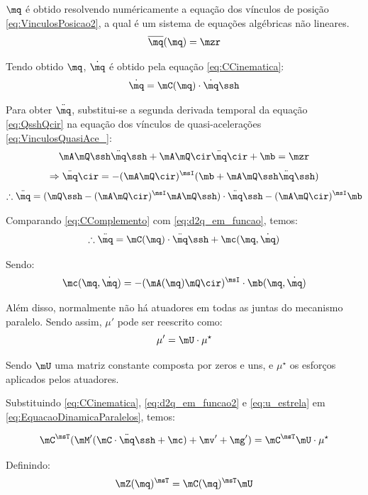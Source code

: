 \documentclass[]{politex}
\begin{document}
$\mq$ é obtido resolvendo numéricamente a equação dos vínculos de posição \eqref{eq:VinculosPosicao2}, a qual é um sistema de equações algébricas não lineares.
$$ \overline{\mq}(\mq) = \mzr $$

Tendo obtido $\mq$, $\dot{\mq}$ é obtido pela equação \eqref{eq:CCinematica}:
$$ \dot{\mq} = \mC(\mq) \cdot \dot{\mq}\ssh $$

Para obter $\ddot{\mq}$, substitui-se a segunda derivada temporal da equação \eqref{eq:QsshQcir} na equação dos vínculos de quasi-acelerações \eqref{eq:VinculosQuasiAce_}:
$$ \mA \mQ\ssh \ddot{\mq}\ssh + \mA \mQ\cir \ddot{\mq}\cir + \mb = \mzr $$
$$ \Rightarrow  \ddot{\mq}\cir = - (\mA \mQ\cir)^\msI (\mb + \mA \mQ\ssh \ddot{\mq}\ssh) $$
\begin{equation} \label{eq:d2q_em_funcao}
\therefore \ddot{\mq} =
(\mQ\ssh - (\mA \mQ\cir)^\msI  \mA \mQ\ssh) \cdot \ddot{\mq}\ssh - (\mA \mQ\cir)^\msI \mb
\end{equation}

Comparando \eqref{eq:CComplemento} com \eqref{eq:d2q_em_funcao}, temos:
\begin{equation} \label{eq:d2q_em_funcao2}
\therefore \ddot{\mq} = \mC(\mq) \cdot \ddot{\mq}\ssh + \mc(\mq, \dot{\mq})
\end{equation}

Sendo:
\begin{equation}
\mc(\mq, \dot{\mq}) = - (\mA(\mq) \mQ\cir)^\msI \cdot \mb(\mq,\dot{\mq})
\end{equation}

Além disso, normalmente não há atuadores em todas as juntas do mecanismo paralelo. Sendo assim, $\mu'$ pode ser reescrito como:
\begin{equation} \label{eq:u_estrela}
\mu' = \mU \cdot \mu^\star
\end{equation}

Sendo $\mU$ uma matriz constante composta por zeros e uns, e $\mu^\star$ os esforços aplicados pelos atuadores.

Substituindo \eqref{eq:CCinematica}, \eqref{eq:d2q_em_funcao2} e \eqref{eq:u_estrela} em \eqref{eq:EquacaoDinamicaParalelos}, temos:

\begin{equation}
\mC^\msT ( \mM' (\mC \cdot \ddot{\mq}\ssh + \mc) + \mv' + \mg') = \mC^\msT \mU \cdot \mu^\star
\end{equation}

Definindo:
\begin{equation}
\mZ(\mq)^\msT = \mC(\mq)^\msT \mU
\end{equation}
\end{document}
